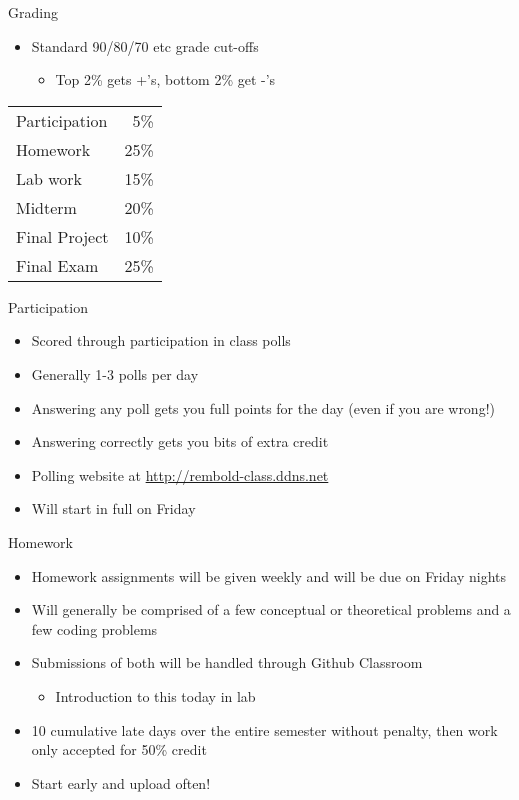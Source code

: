 \documentclass[pdf, aspectratio=169, 12pt]{beamer}
\begin{document}
\begin{frame}{Grading}
	\begin{itemize}
		\item Standard 90/80/70 etc grade cut-offs
			\begin{itemize}
				\item Top 2\% gets +'s, bottom 2\% get -'s
			\end{itemize}
	\end{itemize}
	\vspace{1cm}
	\centering
	\begin{tabular}{lr}
		\toprule
		Participation & 5\% \\
		Homework & 25\% \\
		Lab work & 15\% \\
		Midterm & 20\% \\
		Final Project & 10\% \\
		Final Exam & 25\% \\
		\bottomrule
	\end{tabular}
\end{frame}

\begin{frame}{Participation}
	\begin{itemize}
		\item Scored through participation in class polls
		\item Generally 1-3 polls per day
		\item Answering any poll gets you full points for the day (even if you are wrong!)
		\item Answering correctly gets you bits of extra credit
		\item Polling website at \url{http://rembold-class.ddns.net}
		\item Will start in full on Friday
	\end{itemize}
\end{frame}

\begin{frame}{Homework}
	\begin{itemize}
		\item Homework assignments will be given weekly and will be due on Friday nights
		\item Will generally be comprised of a few conceptual or theoretical problems and a few coding problems
		\item Submissions of \alert{both} will be handled through Github Classroom
			\begin{itemize}
				\item Introduction to this today in lab
			\end{itemize}
		\item 10 cumulative late days over the entire semester without penalty, then work only accepted for 50\% credit
		\item Start \alert{early} and upload often!
	\end{itemize}
\end{frame}
\end{document}
